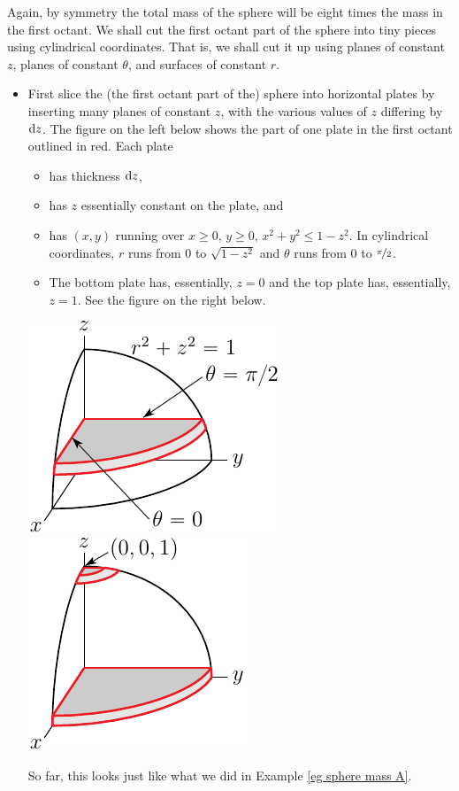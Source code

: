 \begin{eg}
Again, by symmetry the total mass of the sphere will be eight times 
the mass in the first octant. We shall cut the first octant part 
of the sphere into tiny pieces using  cylindrical coordinates. That is, 
we shall cut it up using planes of constant $z$, planes of constant $\theta$, 
and surfaces of constant $r$.
\begin{itemize}
\item
First slice the (the first octant part of the) sphere into horizontal 
plates by inserting many planes of
constant $z$, with the various values of $z$ differing by $\mathrm{d}z$.
The figure on the left below shows the part of one plate in the first octant
outlined in red. Each plate
\vspace{-\topsep}
\begin{itemize} \itemsep1pt \parskip0pt 
\item
has thickness $\mathrm{d}z$, 
\item
has $z$ essentially constant on the plate, and 
\item
has $(x,y)$ running over $x\ge 0$, $y\ge 0$, $x^2+y^2\le 1-z^2$.
In cylindrical coordinates, $r$ runs from $0$ to $\sqrt{1-z^2}$
and $\theta$ runs from $0$ to $\nicefrac{\pi}{2}$.
\item 
The bottom plate has, essentially, $z=0$ and the top plate has, essentially, 
$z=1$. See the figure on the right below.
\end{itemize}
\begin{efig}
\begin{center}
    \includegraphics{sphereCyl1a.pdf}\qquad
    \includegraphics{sphereCyl1b.pdf}
\end{center}
\end{efig}
\vspace{-\topsep}
So far, this looks just like what we did in Example \ref{eg sphere mass A}.


\end{itemize}
\end{eg}
